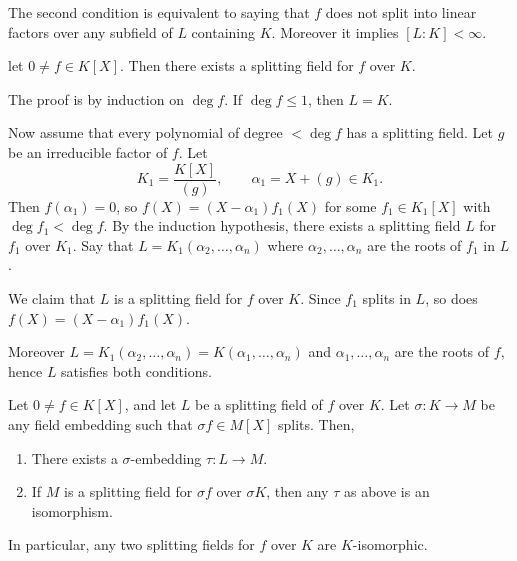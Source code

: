 \documentclass[12pt]{article}
\begin{document}
The second condition is equivalent to saying that $f$ does not split into linear factors over any subfield of $L$ containing $K$. Moreover it implies $[L:K] < \infty$.


\begin{theorem}
	let $0 \neq f \in K[X]$. Then there exists a splitting field for $f$ over $K$.
\end{theorem}

\begin{proofbox}
	The proof is by induction on $\deg f$. If $\deg f \leq 1$, then $L = K$.

	Now assume that every polynomial of degree $< \deg f$ has a splitting field. Let $g$ be an irreducible factor of $f$. Let
	\[
		K_1 = \frac{K[X]}{(g)}, \qquad \alpha_1 = X + (g) \in K_1.
	\]
	Then $f(\alpha_1) = 0$, so $f(X) = (X - \alpha_1)f_1(X)$ for some $f_1 \in K_1[X]$ with $\deg f_1 < \deg f$. By the induction hypothesis, there exists a splitting field $L$ for $f_1$ over $K_1$. Say that $L = K_1(\alpha_2, \ldots, \alpha_n)$ where $\alpha_2, \ldots, \alpha_n$ are the roots of $f_1$ in $L$.

	We claim that $L$ is a splitting field for $f$ over $K$. Since $f_1$ splits in $L$, so does $f(X) = (X-\alpha_1)f_1(X)$.

	Moreover $L = K_1(\alpha_2, \ldots, \alpha_n) = K(\alpha_1, \ldots, \alpha_n)$ and $\alpha_1, \ldots, \alpha_n$ are the roots of $f$, hence $L$ satisfies both conditions.
\end{proofbox}

\begin{theorem}
	Let $0 \neq f \in K[X]$, and let $L$ be a splitting field of $f$ over $K$. Let $\sigma : K \to M$ be any field embedding such that $\sigma f \in M[X]$ splits. Then,
	\begin{enumerate}[\normalfont(i)]
		\item There exists a $\sigma$-embedding $\tau : L \to M$.
		\item If $M$ is a splitting field for $\sigma f$ over $\sigma K$, then any $\tau$ as above is an isomorphism.
	\end{enumerate}
\end{theorem}

In particular, any two splitting fields for $f$ over $K$ are $K$-isomorphic.
\end{document}
